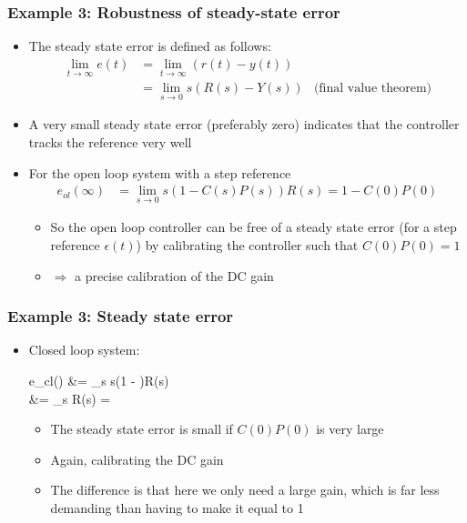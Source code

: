 \begin{frame}
	\frametitle{Example 3: Robustness of steady-state error}
	\begin{itemize}
		\item The steady state error is defined as follows:
		\begin{align*}
			\lim\limits_{t \rightarrow \infty} e(t)
			&= \lim\limits_{t \rightarrow \infty} (r(t) - y(t)) \\
			&= \lim\limits_{s \rightarrow 0} s(R(s) - Y(s)) &\text{(final value theorem)}
		\end{align*}
		
		\item A very small steady state error (preferably zero) indicates that the controller tracks the reference very well
		
		\item For the open loop system with a step reference
		\begin{align*}
			e_{ol}(\infty) &= \lim\limits_{s \rightarrow 0}
			s(1 - C(s)P(s))R(s) = 1 - C(0)P(0)
		\end{align*}
		\begin{itemize}
			\item So the open loop controller can be free of a steady state error (for a step reference $\epsilon(t)$) by calibrating the controller such that $C(0)P(0)=1$
			\item $\Rightarrow$ a precise calibration of the DC gain
		\end{itemize}
	\end{itemize}
	
\end{frame}


\begin{frame}
	\frametitle{Example 3: Steady state error}
	\begin{itemize}
		\item Closed loop system:
		\begin{flalign*}
			e_{cl}(\infty) &= \lim\limits_{s } s\left(1 - \right)R(s) \\
			&= \lim\limits_{s } R(s) = 
		\end{flalign*}
		\begin{itemize}
			\item The steady state error is small if $C(0)P(0)$ is very large
			\item Again, calibrating the DC gain
			\item The difference is that here we only need a large gain, which is far less demanding than having to make it equal to 1
		\end{itemize}
	\end{itemize}
\end{frame}

